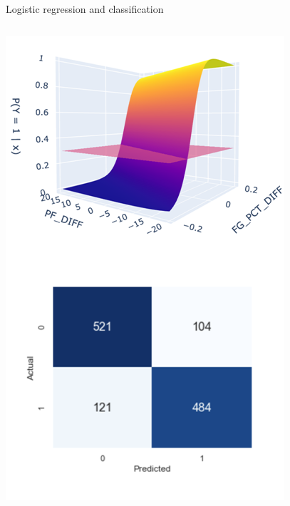 \documentclass[aspectratio=169]{../latex_main/tntbeamer}  %
\begin{document}
\begin{frame}{Logistic regression and classification}
\begin{columns}
	            
	            \begin{column}{.4\textwidth}
	                      \begin{center}
	                          \includegraphics[scale=.35]{Bild12}
	                      \end{center} 
	            \end{column}
	       \end{columns}
	\end{frame}
	
	
	
\end{document}
